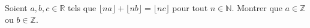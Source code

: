 Soient $a, b, c \in \mathbb{R}$ tels que $\lfloor na \rfloor + \lfloor nb \rfloor = \lfloor nc \rfloor$ pour tout $n \in \mathbb{N}$. Montrer que $a \in \mathbb{Z}$ ou $b \in \mathbb{Z}$.
